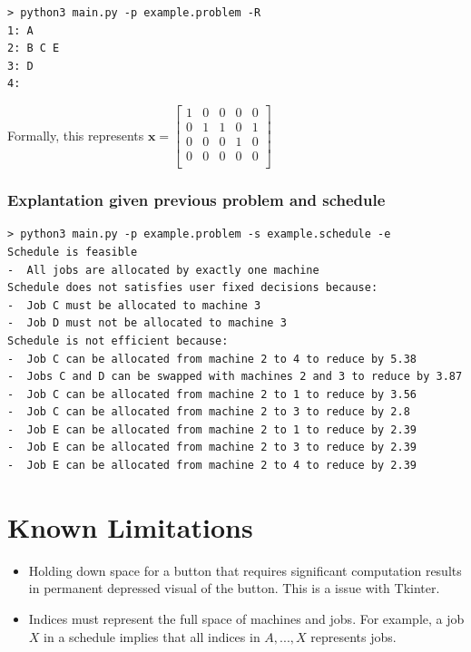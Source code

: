 \begin{verbatim}
> python3 main.py -p example.problem -R
1: A
2: B C E
3: D
4: 
\end{verbatim}

Formally, this represents $\mathbf{x}=\begin{bmatrix}
	1&0&0&0&0\\
	0&1&1&0&1\\
	0&0&0&1&0\\
	0&0&0&0&0\\
\end{bmatrix}$

\subsubsection{Explantation given previous problem and schedule}

\begin{verbatim}
> python3 main.py -p example.problem -s example.schedule -e
Schedule is feasible
-  All jobs are allocated by exactly one machine
Schedule does not satisfies user fixed decisions because:
-  Job C must be allocated to machine 3
-  Job D must not be allocated to machine 3
Schedule is not efficient because:
-  Job C can be allocated from machine 2 to 4 to reduce by 5.38
-  Jobs C and D can be swapped with machines 2 and 3 to reduce by 3.87
-  Job C can be allocated from machine 2 to 1 to reduce by 3.56
-  Job C can be allocated from machine 2 to 3 to reduce by 2.8
-  Job E can be allocated from machine 2 to 1 to reduce by 2.39
-  Job E can be allocated from machine 2 to 3 to reduce by 2.39
-  Job E can be allocated from machine 2 to 4 to reduce by 2.39
\end{verbatim}

\section{Known Limitations}

\begin{itemize}
	\item Holding down space for a button that requires significant computation results in permanent depressed visual of the button. This is a issue with Tkinter.
	\item Indices must represent the full space of machines and jobs. For example, a job $X$ in a schedule implies that all indices in $A,...,X$ represents jobs.
\end{itemize}